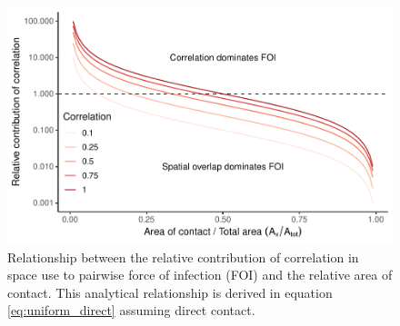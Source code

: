 \documentclass[letterpaper]{article}
\begin{document}
\begin{figure}
    \includegraphics[width=\textwidth]{figures/correlation_analytical_figure.pdf}
    \caption{Relationship between the relative contribution of correlation in space use to pairwise force of infection (FOI) and the relative area of contact. This analytical relationship is derived in equation \ref{eq:uniform_direct} assuming direct contact.}  %
    \label{fig:analytical_corr}
\end{figure}
\end{document}
